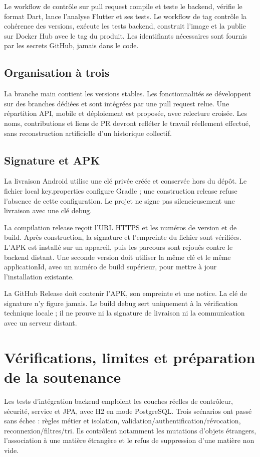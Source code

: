 \documentclass[11pt,a4paper]{article}
\begin{document}
Le workflow de contrôle sur pull request compile et teste le backend, vérifie le format Dart, lance l'analyse Flutter et ses tests. Le workflow de tag contrôle la cohérence des versions, exécute les tests backend, construit l'image et la publie sur Docker Hub avec le tag du produit. Les identifiants nécessaires sont fournis par les secrets GitHub, jamais dans le code.

\subsection*{Organisation à trois}
La branche main contient les versions stables. Les fonctionnalités se développent sur des branches dédiées et sont intégrées par une pull request relue. Une répartition API, mobile et déploiement est proposée, avec relecture croisée. Les noms, contributions et liens de PR devront refléter le travail réellement effectué, sans reconstruction artificielle d'un historique collectif.

\subsection*{Signature et APK}
La livraison Android utilise une clé privée créée et conservée hors du dépôt. Le fichier local key.properties configure Gradle ; une construction release refuse l'absence de cette configuration. Le projet ne signe pas silencieusement une livraison avec une clé debug.

La compilation release reçoit l'URL HTTPS et les numéros de version et de build. Après construction, la signature et l'empreinte du fichier sont vérifiées. L'APK est installé sur un appareil, puis les parcours sont rejoués contre le backend distant. Une seconde version doit utiliser la même clé et le même applicationId, avec un numéro de build supérieur, pour mettre à jour l'installation existante.

La GitHub Release doit contenir l'APK, son empreinte et une notice. La clé de signature n'y figure jamais. Le build debug sert uniquement à la vérification technique locale ; il ne prouve ni la signature de livraison ni la communication avec un serveur distant.
\newpage
\section{Vérifications, limites et préparation de la soutenance}
Les tests d'intégration backend emploient les couches réelles de contrôleur, sécurité, service et JPA, avec H2 en mode PostgreSQL. Trois scénarios ont passé sans échec : règles métier et isolation, validation/authentification/révocation, reconnexion/filtres/tri. Ils contrôlent notamment les mutations d'objets étrangers, l'association à une matière étrangère et le refus de suppression d'une matière non vide.
\end{document}
